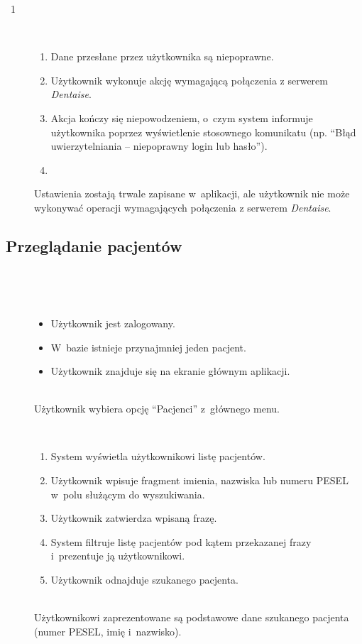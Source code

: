 \documentclass[11pt]{aghdpl}
\begin{document}
\begin{description}
\begin{itemize}
			\end{itemize}
		\item[\useCaseWyjatek~1] \hfill \\
			\begin{enumerate}[label=2a\arabic*.]
				\item Dane przesłane przez użytkownika są niepoprawne.
				\item Użytkownik wykonuje akcję wymagającą połączenia z serwerem \emph{Dentaise}.
				\item Akcja kończy się niepowodzeniem, o~czym system informuje użytkownika poprzez wyświetlenie stosownego komunikatu (np. ``Błąd uwierzytelniania -- niepoprawny login lub hasło'').
				\item \useCaseEnd
			\end{enumerate}
			Ustawienia zostają trwale zapisane w~aplikacji, ale użytkownik nie może wykonywać operacji wymagających połączenia z serwerem \emph{Dentaise}.
	\end{description}

\subsection{Przeglądanie pacjentów}
	
	\begin{description}
		\item[\useCaseAktor] \hfill \\
			\useCaseUzytkownik
		\item[\useCaseWarPocz] \hfill \\
			\begin{itemize}
				\item Użytkownik jest zalogowany.
				\item W~bazie istnieje przynajmniej jeden pacjent.
				\item Użytkownik znajduje się na ekranie głównym aplikacji.
			\end{itemize}
		\item[\useCaseZdarzInicj] \hfill \\
			Użytkownik wybiera opcję ``Pacjenci'' z~głównego menu.
		\item[\useCaseScenBaz] \hfill \\ 
			\begin{enumerate}
				\item System wyświetla użytkownikowi listę pacjentów.
				\item Użytkownik wpisuje fragment imienia, nazwiska lub numeru PESEL w~polu służącym do wyszukiwania.
				\item Użytkownik zatwierdza wpisaną frazę.
				\item System filtruje listę pacjentów pod kątem przekazanej frazy i~prezentuje ją użytkownikowi.
				\item Użytkownik odnajduje szukanego pacjenta.
			\end{enumerate}
		\item[\useCaseWarKonc] \hfill \\ 
			Użytkownikowi zaprezentowane są podstawowe dane szukanego pacjenta (numer PESEL, imię i~nazwisko).
	\end{description}
\end{document}
